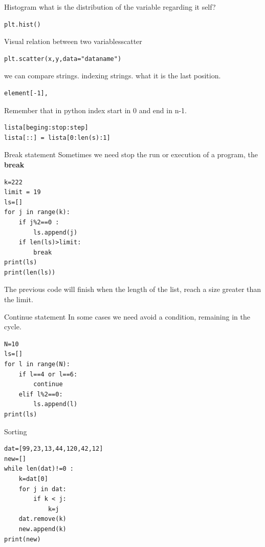 \documentclass{beamer}
\begin{document}
\begin{frame}[fragile]{Histogram}
what is the distribution of the variable regarding it self?
\begin{lstlisting}
plt.hist()
\end{lstlisting}
\end{frame}

\begin{frame}[fragile]{Visual relation between two variables}{scatter}
\begin{lstlisting}
plt.scatter(x,y,data="dataname")
\end{lstlisting}
\end{frame}




\begin{frame}[fragile]
we can compare strings.
indexing strings.
what it is the last position.
\begin{lstlisting}
element[-1],
\end{lstlisting}
Remember that in python index start in 0 and end in n-1.
\begin{lstlisting}
lista[beging:stop:step]
lista[::] = lista[0:len(s):1]
\end{lstlisting}
\end{frame}




\begin{frame}[fragile]{Break statement}
Sometimes we need stop the run or execution of a program, the \textbf{break} 
\begin{lstlisting}
k=222
limit = 19
ls=[]
for j in range(k):
    if j%2==0 :
        ls.append(j)
    if len(ls)>limit:
        break
print(ls)
print(len(ls))
\end{lstlisting}
The previous code will finish when the length of the list, reach a size greater than the limit. 
\end{frame}



\begin{frame}[fragile]{Continue statement}
In some cases we need avoid a condition, remaining in the cycle. 
\begin{lstlisting}
N=10
ls=[]
for l in range(N):
    if l==4 or l==6:
        continue
    elif l%2==0:
        ls.append(l)
print(ls)
\end{lstlisting}

\end{frame}


\begin{frame}[fragile]{Sorting}
\begin{lstlisting}
dat=[99,23,13,44,120,42,12]
new=[]
while len(dat)!=0 :
    k=dat[0]
    for j in dat:
        if k < j:
            k=j
    dat.remove(k)
    new.append(k)
print(new)
\end{lstlisting}
\end{frame}
\end{document}
